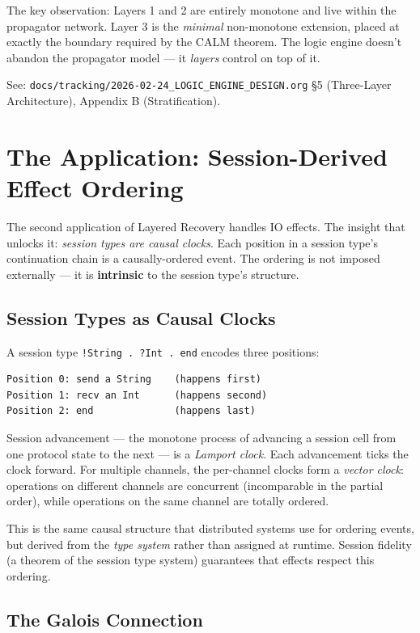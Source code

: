 \documentclass[11pt]{article}
\begin{document}
The key observation: Layers 1 and 2 are entirely monotone and live within the
propagator network. Layer 3 is the \emph{minimal} non-monotone extension, placed
at exactly the boundary required by the CALM theorem. The logic engine doesn't
abandon the propagator model --- it \emph{layers} control on top of it.

See: \texttt{docs/tracking/2026-02-24\_LOGIC\_ENGINE\_DESIGN.org} §5 (Three-Layer
Architecture), Appendix B (Stratification).
\section{The Application: Session-Derived Effect Ordering}
\label{sec:org4e5fb17}

The second application of Layered Recovery handles IO effects. The insight that
unlocks it: \emph{session types are causal clocks}. Each position in a session type's
continuation chain is a causally-ordered event. The ordering is not imposed
externally --- it is \textbf{intrinsic} to the session type's structure.
\subsection{Session Types as Causal Clocks}
\label{sec:org73b94e7}

A session type \texttt{!String . ?Int . end} encodes three positions:

\begin{verbatim}
Position 0: send a String    (happens first)
Position 1: recv an Int      (happens second)
Position 2: end              (happens last)
\end{verbatim}

Session advancement --- the monotone process of advancing a session cell from
one protocol state to the next --- is a \emph{Lamport clock}. Each advancement ticks
the clock forward. For multiple channels, the per-channel clocks form a \emph{vector
clock}: operations on different channels are concurrent (incomparable in the
partial order), while operations on the same channel are totally ordered.

This is the same causal structure that distributed systems use for ordering
events, but derived from the \emph{type system} rather than assigned at runtime.
Session fidelity (a theorem of the session type system) guarantees that effects
respect this ordering.
\subsection{The Galois Connection}
\label{sec:org880c6c3}
\end{document}
